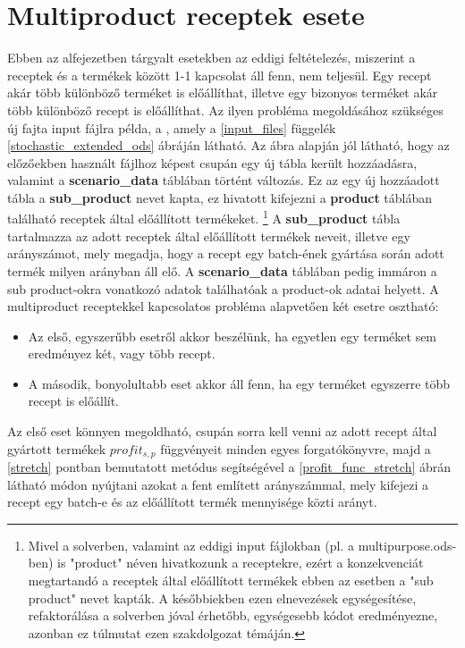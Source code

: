 \section{Multiproduct receptek esete} \label{extended_multiproduct}
Ebben az alfejezetben tárgyalt esetekben az eddigi feltételezés, miszerint a receptek és a termékek között 1-1 kapcsolat áll fenn, nem teljesül.
Egy recept akár több különböző terméket is előállíthat, illetve egy bizonyos terméket akár több különböző recept is előállíthat.
Az ilyen probléma megoldásához szükséges új fajta input fájlra példa, a , amely a \ref{input_files} függelék \ref{stochastic_extended_ods} ábráján látható.
Az ábra alapján jól látható, hogy az előzőekben használt  fájlhoz képest csupán egy új tábla került hozzáadásra, valamint a \textbf{scenario\_data} táblában történt változás.
Ez az egy új hozzáadott tábla a \textbf{sub\_product} nevet kapta, ez hivatott kifejezni a \textbf{product} táblában található receptek által előállított termékeket. \footnote{Mivel a solverben, valamint az eddigi input fájlokban (pl. a multipurpose.ods-ben) is "product" néven hivatkozunk a receptekre, ezért a konzekvenciát megtartandó a receptek által előállított termékek ebben az esetben a "sub product" nevet kapták. A későbbiekben ezen elnevezések egységesítése, refaktorálása a solverben jóval érhetőbb, egységesebb kódot eredményezne, azonban ez túlmutat ezen szakdolgozat témáján.}
A \textbf{sub\_product} tábla tartalmazza az adott receptek által előállított termékek neveit, illetve egy arányszámot, mely megadja, hogy a recept egy batch-ének gyártása során adott termék milyen arányban áll elő.
A \textbf{scenario\_data} táblában pedig immáron a sub product-okra vonatkozó adatok találhatóak a product-ok adatai helyett.
A multiproduct receptekkel kapcsolatos probléma alapvetően két esetre osztható:
\begin{itemize}
\item Az első, egyszerűbb esetről akkor beszélünk, ha egyetlen egy terméket sem eredményez két, vagy több recept.
\item A második, bonyolultabb eset akkor áll fenn, ha egy terméket egyszerre több recept is előállít.
\end{itemize}
Az első eset könnyen megoldható, csupán sorra kell venni az adott recept által gyártott termékek $profit_{s,p}$ függvényeit minden egyes forgatókönyvre, majd a \ref{stretch} pontban bemutatott metódus segítségével a \ref{profit_func_stretch} ábrán látható módon nyújtani azokat a fent említett arányszámmal, mely kifejezi a recept egy batch-e és az előállított termék mennyisége közti arányt.
